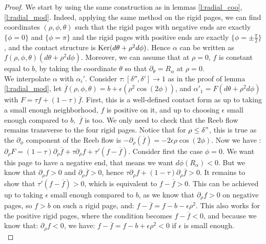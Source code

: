\documentclass[../main.tex]{subfiles}
\begin{document}
    
\begin{proof}
We start by using the same construction as in lemmas \ref{l:radial_coo},\ref{l:radial_mod}. Indeed, applying the same method on the rigid pages, we can find coordinates $(\rho,\phi,\theta)$ such that the rigid pages with negative ends are exactly $\{\phi= 0\}$ and $\{\phi = \pi\}$ and the rigid pages with positive ends are exactly $\{\phi = \pm\frac{\pi}{2}\}$, and the contact structure is $\text{Ker}(d\theta + \rho^2d\phi)$. Hence $\alpha$ can be written as $f(\rho,\phi,\theta)(d\theta + \rho^2d\phi)$. Moreover, we can assume that at $\rho =0$, $f$ is constant equal to $b$, by taking the coordinate $\theta$ so that $\partial_\theta = R_\alpha$ at $\rho = 0$. \\

We interpolate $\alpha$ with $\alpha_i'$. Consider $\tau : [\delta'',\delta']\rightarrow 1$ as in the proof of lemma \ref{l:radial_mod}, let $\overline{f}(\rho,\phi,\theta) = b + \epsilon (\rho^2\cos(2\phi))$, and $\alpha'_1 = F(d\theta + \rho^2d\phi)$ with $F = \tau f + (1-\tau)\overline{f}$. First, this is a well-defined contact form as up to taking a small enough neighborhood, $f$ is positive on it, and up to choosing $\epsilon$ small enough compared to $b,\,\,\overline{f}$ is too. We only need to check that the Reeb flow remains transverse to the four rigid pages. Notice that for $\rho \leq \delta "$, this is true as the $\partial_\phi$ component of the Reeb flow is $-\partial_\rho(\overline{f}) = -2\epsilon\rho \cos(2\phi)$. Now we have : $\partial_\rho F = (1-\tau)\partial_\rho \overline{f} + \tau \partial_\rho f + \tau'(f-\overline{f})$. Consider first the case $\phi = 0$. We want this page to have a negative end, that means we want $d\phi(R_\alpha) < 0$. But we know that $\partial_\rho f > 0$ and $\partial_\rho \overline{f} > 0$, hence $\tau \partial_\rho f + (1-\tau)\partial_\rho\overline{f}> 0$. It remains to show that $\tau'(f-\overline{f}) > 0$, which is equivalent to $f-\overline{f} > 0$. This can be achieved up to taking $\epsilon$ small enough compared to $b$, as we know that $\partial_\rho f > 0$ on negative pages, so $f> b$ on such a rigid page, and: $f-\overline{f} = f - b- \epsilon \rho^2$. This also works for the positive rigid pages, where the condition becomes $f-\overline{f} < 0$, and because we know that: $\partial_\rho f< 0$, we have: $f-\overline{f} = f - b + \epsilon \rho^2<0$ if $\epsilon$ is small enough. \\


\end{proof}
\end{document}
